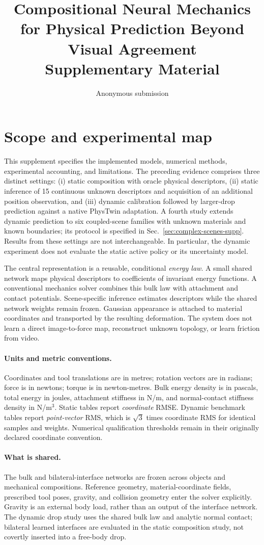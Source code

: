 \documentclass[10pt,twocolumn,letterpaper]{article}
\title{Compositional Neural Mechanics for Physical Prediction Beyond Visual Agreement\\Supplementary Material}
\author{Anonymous submission}
\begin{document}
\maketitle
\section{Scope and experimental map}
This supplement specifies the implemented models, numerical methods, experimental accounting, and limitations. The preceding evidence comprises three distinct settings: (i) static composition with oracle physical descriptors, (ii) static inference of 15 continuous unknown descriptors and acquisition of an additional position observation, and (iii) dynamic calibration followed by larger-drop prediction against a native PhysTwin adaptation. A fourth study extends dynamic prediction to six coupled-scene families with unknown materials and known boundaries; its protocol is specified in Sec.~\ref{sec:complex-scenes-supp}. Results from these settings are not interchangeable. In particular, the dynamic experiment does not evaluate the static active policy or its uncertainty model.

The central representation is a reusable, conditional \emph{energy law}. A small shared network maps physical descriptors to coefficients of invariant energy functions. A conventional mechanics solver combines this bulk law with attachment and contact potentials. Scene-specific inference estimates descriptors while the shared network weights remain frozen. Gaussian appearance is attached to material coordinates and transported by the resulting deformation. The system does not learn a direct image-to-force map, reconstruct unknown topology, or learn friction from video.

\paragraph{Units and metric conventions.}
Coordinates and tool translations are in metres; rotation vectors are in radians; force is in newtons; torque is in newton-metres. Bulk energy density is in pascals, total energy in joules, attachment stiffness in N/m, and normal-contact stiffness density in N/m$^3$. Static tables report \emph{coordinate} RMSE. Dynamic benchmark tables report \emph{point-vector} RMS, which is $\sqrt{3}$ times coordinate RMS for identical samples and weights. Numerical qualification thresholds remain in their originally declared coordinate convention.

\paragraph{What is shared.}
The bulk and bilateral-interface networks are frozen across objects and mechanical compositions. Reference geometry, material-coordinate fields, prescribed tool poses, gravity, and collision geometry enter the solver explicitly. Gravity is an external body load, rather than an output of the interface network. The dynamic drop study uses the shared bulk law and analytic normal contact; bilateral learned interfaces are evaluated in the static composition study, not covertly inserted into a free-body drop.
\end{document}
